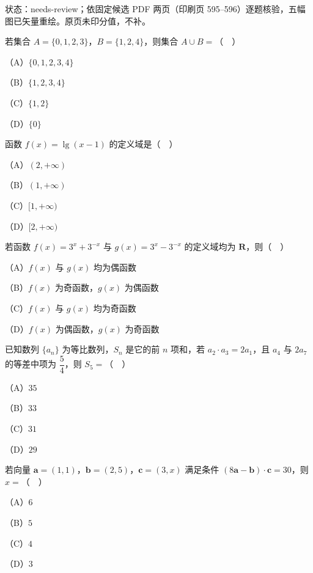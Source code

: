 

状态：needs-review；依固定候选 PDF 两页（印刷页 595–596）逐题核验，五幅图已矢量重绘。原页未印分值，不补。


\begin{question}
若集合 $A=\{0,1,2,3\}$，$B=\{1,2,4\}$，则集合 $A\cup B=$（　）

（A）$\{0,1,2,3,4\}$

（B）$\{1,2,3,4\}$

（C）$\{1,2\}$

（D）$\{0\}$

\end{question}
\begin{question}
函数 $f(x)=\lg(x-1)$ 的定义域是（　）

（A）$(2,+\infty)$

（B）$(1,+\infty)$

（C）$[1,+\infty)$

（D）$[2,+\infty)$

\end{question}
\begin{question}
若函数 $f(x)=3^x+3^{-x}$ 与 $g(x)=3^x-3^{-x}$ 的定义域均为 $\mathbf R$，则（　）

（A）$f(x)$ 与 $g(x)$ 均为偶函数

（B）$f(x)$ 为奇函数，$g(x)$ 为偶函数

（C）$f(x)$ 与 $g(x)$ 均为奇函数

（D）$f(x)$ 为偶函数，$g(x)$ 为奇函数

\end{question}
\begin{question}
已知数列 $\{a_n\}$ 为等比数列，$S_n$ 是它的前 $n$ 项和，若 $a_2\cdot a_3=2a_1$，且 $a_4$ 与 $2a_7$ 的等差中项为 $\dfrac54$，则 $S_5=$（　）

（A）$35$

（B）$33$

（C）$31$

（D）$29$

\end{question}
\begin{question}
若向量 $\boldsymbol a=(1,1)$，$\boldsymbol b=(2,5)$，$\boldsymbol c=(3,x)$ 满足条件 $(8\boldsymbol a-\boldsymbol b)\cdot\boldsymbol c=30$，则 $x=$（　）

（A）$6$

（B）$5$

（C）$4$

（D）$3$

\end{question}
